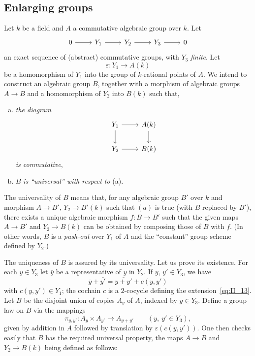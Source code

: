 \subsection{Enlarging groups}
\label{sec:II_13}
Let $k$ be a field and $A$ a commutative algebraic group over $k$. Let
\begin{equation}\label{eq:II_13}
	\begin{tikzcd}
		0 \arrow[r] & Y_1 \arrow[r] & Y_2 \arrow[r] & Y_3 \arrow[r] & 0
	\end{tikzcd}
\end{equation}
an exact sequence of (abstract) commutative groups, with $Y_3$ \emph{finite}.
Let
\[
\varepsilon : Y_1 \rightarrow A(k)
\]
be a homomorphism of $Y_1$ into the group of $k$-rational points of $A$. We 
intend to construct an algebraic group $B$, together with a morphism of 
algebraic groups $A \to B$ and a homomorphism of $Y_2$ into $B(k)$ such that,
\begin{enumerate}[(a)]
	\item \emph{the diagram}
	\[
		\begin{tikzcd}
			Y_1 \arrow[r] \arrow[d] & A(k) \arrow[d] \\
			Y_2 \arrow[r] & B(k)
		\end{tikzcd}
	\]
	\emph{is commutative},
	\item $B$ \emph{is ``universal'' with respect to} (a).
\end{enumerate}
The universality of $B$ means that, for any algebraic group $B'$ over $k$ and 
morphism $A \to B'$, $Y_2 \to B'(k)$ such that $(a)$ is true (with $B$ replaced 
by $B'$), there exists a unique algebraic morphism $f:B \to B'$ such that the 
given maps $A \to B'$ and $Y_2 \to B(k)$ can
\dpage
be obtained by composing those of $B$ with $f$. (In other words, $B$ is a \emph
{push-out} over $Y_1$ of $A$ and the ``constant'' group scheme defined by 
$Y_2$.)

The uniqueness of $B$ is assured by its universality. Let us prove its 
existence. For each $y \in Y_3$ let $\overline{y}$ be a representative of $y$
in 
$Y_2$. If $y$, $y' \in Y_3$, we have
\[
\overline{y} + \overline{y'} = \overline{y + y'} + c(y, y')
\]
with $c(y, y') \in Y_1$; the cochain $c$ is a $2$-cocycle defining the 
extension~\ref{eq:II_13}. Let $B$ be the disjoint union of copies $A_y$ of $A$, 
indexed by $y \in Y_3$. Define a group law on $B$ via the mappings
\[
\pi_{y, y'} : A_y \times A_{y'} \rightarrow A_{y + y'} \qquad (y,~y' \in Y_3),
\]
given by addition in $A$ followed by translation by $\varepsilon(c(y,y'))$. One 
then checks easily that $B$ has the required universal  property, the maps $A 
\to B$ and $Y_2 \to B(k)$ being defined as follows:

